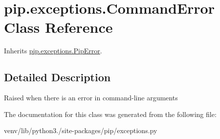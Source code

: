 \hypertarget{classpip_1_1exceptions_1_1_command_error}{}\section{pip.\+exceptions.\+Command\+Error Class Reference}
\label{classpip_1_1exceptions_1_1_command_error}


Inherits \hyperlink{classpip_1_1exceptions_1_1_pip_error}{pip.\+exceptions.\+Pip\+Error}.



\subsection{Detailed Description}
\begin{DoxyVerb}Raised when there is an error in command-line arguments\end{DoxyVerb}
 

The documentation for this class was generated from the following file\+:\begin{DoxyCompactItemize}
\item 
venv/lib/python3./site-\/packages/pip/exceptions.\+py\end{DoxyCompactItemize}
